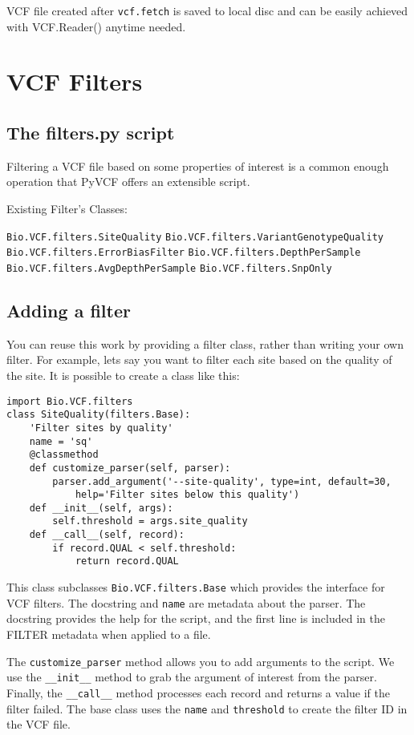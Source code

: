 \noindent VCF file created after \verb|vcf.fetch| is saved to local disc and can be easily achieved with
VCF.Reader() anytime needed.



\section{VCF Filters}

\subsection{The filters.py script}
\noindent Filtering a VCF file based on some properties of interest is a common enough operation that PyVCF offers an extensible script.

Existing Filter's Classes:

\verb|Bio.VCF.filters.SiteQuality|
\verb|Bio.VCF.filters.VariantGenotypeQuality|
\verb|Bio.VCF.filters.ErrorBiasFilter|
\verb|Bio.VCF.filters.DepthPerSample|
\verb|Bio.VCF.filters.AvgDepthPerSample|
\verb|Bio.VCF.filters.SnpOnly|



\subsection{Adding a filter}
\noindent You can reuse this work by providing a filter class, rather than writing your own filter. For example, lets say you want to filter each site based on the quality of the site. It is possible to create a class like this:
\begin{verbatim}   
import Bio.VCF.filters
class SiteQuality(filters.Base):
    'Filter sites by quality'
    name = 'sq'
    @classmethod
    def customize_parser(self, parser):
        parser.add_argument('--site-quality', type=int, default=30,
            help='Filter sites below this quality')
    def __init__(self, args):
        self.threshold = args.site_quality
    def __call__(self, record):
        if record.QUAL < self.threshold:
            return record.QUAL
\end{verbatim}

\noindent This class subclasses \verb|Bio.VCF.filters.Base| which provides the interface for VCF filters. The docstring  and \verb|name| are metadata about the parser.  The docstring provides the help for the script, and the first line is included in the FILTER metadata when applied to a file.

\noindent The \verb|customize_parser| method allows you to add arguments to the script. We use the \verb|__init__| method to grab the argument of interest from the parser. Finally, the \verb|__call__| method processes each record and returns a value if the filter failed.  The base class uses the \verb|name| and \verb|threshold| to create the filter ID in the VCF file.

